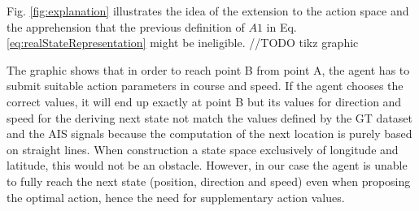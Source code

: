 Fig. \ref{fig:explanation} illustrates the idea of the extension to the action space and the apprehension that the previous definition of $A1$ in Eq. \ref{eq:realStateRepresentation} might be ineligible. 
//TODO tikz graphic

The graphic shows that in order to reach point B from point A, the agent has to submit suitable action parameters in course and speed. If the agent chooses the correct values, it will end up exactly at point B but its values for direction and speed for the deriving next state not match the values defined by the GT dataset and the AIS signals because the computation of the next location is purely based on straight lines. When construction a state space exclusively of longitude and latitude, this would not be an obstacle. However, in our case the agent is unable to fully reach the next state (position, direction and speed) even when proposing the optimal action, hence the need for supplementary action values.